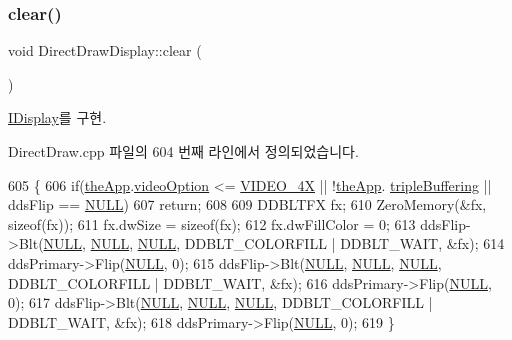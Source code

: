 \subsubsection{\texorpdfstring{clear()}{clear()}}
{\footnotesize\ttfamily void Direct\+Draw\+Display\+::clear (\begin{DoxyParamCaption}{ }\end{DoxyParamCaption})\hspace{0.3cm}{\ttfamily [virtual]}}



\mbox{\hyperlink{class_i_display_affb8a8b5651d138058cdbd088ff3968d}{I\+Display}}를 구현.



Direct\+Draw.\+cpp 파일의 604 번째 라인에서 정의되었습니다.


\begin{DoxyCode}
605 \{
606   \textcolor{keywordflow}{if}(\mbox{\hyperlink{_v_b_a_8cpp_a8095a9d06b37a7efe3723f3218ad8fb3}{theApp}}.\mbox{\hyperlink{class_v_b_a_a17dac073149c897f770c00ed7098ad32}{videoOption}} <= \mbox{\hyperlink{_v_b_a_8h_a531c35e38ede3ea4e5ba5afb24b29493a6468bce6b84e6350d3de126f257eb38d}{VIDEO\_4X}} || !\mbox{\hyperlink{_v_b_a_8cpp_a8095a9d06b37a7efe3723f3218ad8fb3}{theApp}}.
      \mbox{\hyperlink{class_v_b_a_af597e2c2466efdc6365a5d725651b855}{tripleBuffering}} || ddsFlip == \mbox{\hyperlink{getopt1_8c_a070d2ce7b6bb7e5c05602aa8c308d0c4}{NULL}})
607     \textcolor{keywordflow}{return};
608 
609   DDBLTFX fx;
610   ZeroMemory(&fx, \textcolor{keyword}{sizeof}(fx));
611   fx.dwSize = \textcolor{keyword}{sizeof}(fx);
612   fx.dwFillColor = 0;
613   ddsFlip->Blt(\mbox{\hyperlink{getopt1_8c_a070d2ce7b6bb7e5c05602aa8c308d0c4}{NULL}}, \mbox{\hyperlink{getopt1_8c_a070d2ce7b6bb7e5c05602aa8c308d0c4}{NULL}}, \mbox{\hyperlink{getopt1_8c_a070d2ce7b6bb7e5c05602aa8c308d0c4}{NULL}}, DDBLT\_COLORFILL | DDBLT\_WAIT, &fx);
614   ddsPrimary->Flip(\mbox{\hyperlink{getopt1_8c_a070d2ce7b6bb7e5c05602aa8c308d0c4}{NULL}}, 0);
615   ddsFlip->Blt(\mbox{\hyperlink{getopt1_8c_a070d2ce7b6bb7e5c05602aa8c308d0c4}{NULL}}, \mbox{\hyperlink{getopt1_8c_a070d2ce7b6bb7e5c05602aa8c308d0c4}{NULL}}, \mbox{\hyperlink{getopt1_8c_a070d2ce7b6bb7e5c05602aa8c308d0c4}{NULL}}, DDBLT\_COLORFILL | DDBLT\_WAIT, &fx);
616   ddsPrimary->Flip(\mbox{\hyperlink{getopt1_8c_a070d2ce7b6bb7e5c05602aa8c308d0c4}{NULL}}, 0);
617   ddsFlip->Blt(\mbox{\hyperlink{getopt1_8c_a070d2ce7b6bb7e5c05602aa8c308d0c4}{NULL}}, \mbox{\hyperlink{getopt1_8c_a070d2ce7b6bb7e5c05602aa8c308d0c4}{NULL}}, \mbox{\hyperlink{getopt1_8c_a070d2ce7b6bb7e5c05602aa8c308d0c4}{NULL}}, DDBLT\_COLORFILL | DDBLT\_WAIT, &fx);
618   ddsPrimary->Flip(\mbox{\hyperlink{getopt1_8c_a070d2ce7b6bb7e5c05602aa8c308d0c4}{NULL}}, 0);    
619 \}
\end{DoxyCode}
\mbox{\label{class_direct_draw_display_ab680561928153be1285c826d3e4f0dd7}} 
